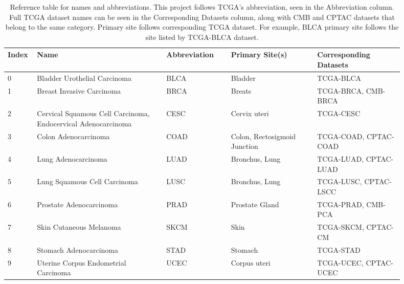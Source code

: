 \documentclass{l4proj}
\begin{document}
\begin{table}[]
\caption{Reference table for names and abbreviations. This project follows TCGA's abbreviation, seen in the Abbreviation column. Full TCGA dataset names can be seen in the Corresponding Datasets column, along with CMB and CPTAC datasets that belong to the same category. Primary site follows corresponding TCGA dataset. For example, BLCA primary site follows the site listed by TCGA-BLCA dataset.}
\label{tab:abbreviation}
\begin{tabular}{@{}p{0.05\linewidth}p{0.3\linewidth}p{0.15\linewidth}p{0.2\linewidth}p{0.2\linewidth}@{}}
\textbf{Index} & \textbf{Name}                                 & \textbf{Abbreviation} & \textbf{Primary Site(s)}              & \textbf{Corresponding Datasets} \\ \midrule
0     & Bladder Urothelial Carcinoma         & BLCA         & Bladder                      & TCGA-BLCA              \\
1     & Breast Invasive Carcinoma            & BRCA         & Breats                       & TCGA-BRCA, CMB-BRCA    \\
2     & Cervical Squamous Cell Carcinoma, Endocervical Adenocarcinoma & CESC & Cervix uteri & TCGA-CESC             \\
3     & Colon Adenocarcinoma                 & COAD         & Colon, Rectosigmoid Junction & TCGA-COAD, CPTAC-COAD  \\
4     & Lung Adenocarcinoma                  & LUAD         & Bronchus, Lung               & TCGA-LUAD, CPTAC-LUAD  \\
5     & Lung Squamous Cell Carcinoma         & LUSC         & Bronchus, Lung               & TCGA-LUSC, CPTAC-LSCC  \\
6     & Prostate Adenocarcinoma              & PRAD         & Prostate Gland               & TCGA-PRAD, CMB-PCA     \\
7     & Skin Cutaneous Melanoma              & SKCM         & Skin                         & TCGA-SKCM, CPTAC-CM    \\
8     & Stomach Adenocarcinoma               & STAD         & Stomach                      & TCGA-STAD              \\
9     & Uterine Corpus Endometrial Carcinoma & UCEC         & Corpus uteri                 & TCGA-UCEC, CPTAC-UCEC  \\ 
\end{tabular}
\end{table}
\end{document}
